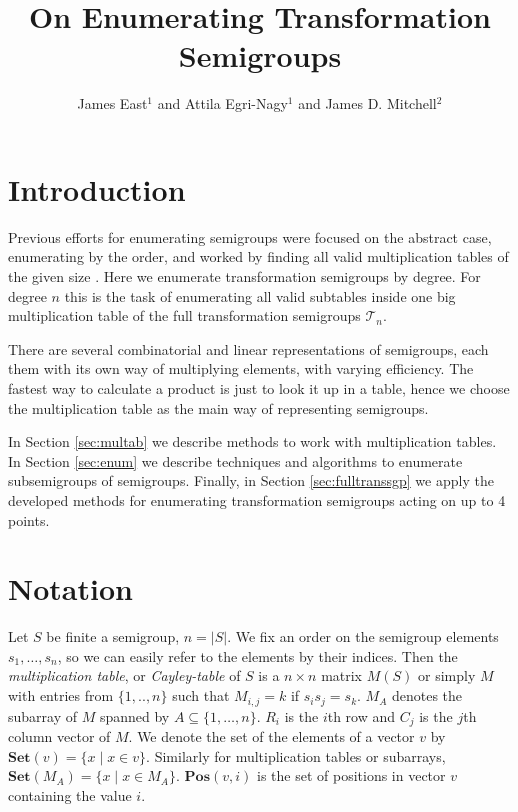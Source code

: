 \documentclass{amsart}
\newcommand{\cT}{{\mathcal T}}
\newcommand{\Set}{\mathbf{Set}}
\newcommand{\Pos}{\mathbf{Pos}}
\theoremstyle{plain}
\theoremstyle{definition}
\begin{document}
\title{On Enumerating Transformation Semigroups}
\author{James East$^1$ and Attila Egri-Nagy$^{1}$ and James D. Mitchell$^2$}
\address{$^1$Centre for Research in Mathematics, School of Computing, Engineering and Mathematics, University of Western Sydney (Parramatta Campus), Locked Bag 1797, Penrith, NSW 2751, Australia}
\address{$^2$ Mathematical Institute, University of St Andrews, North Haugh, St Andrews, Fife, KY16 9SS, Scotland}

\maketitle
\begin{abstract}
\end{abstract}
\tableofcontents
\section{Introduction}
Previous efforts for enumerating semigroups were focused on the abstract case, enumerating by the order, and worked by finding all valid multiplication tables of the given size \cite{For55,tamura1,tamura2,Ple67,KRS76,JW77,SZT94,monoidenum2009}.
Here we enumerate transformation semigroups by degree.
For degree $n$ this is the task of enumerating all valid subtables inside one big multiplication table of the  full transformation semigroups $\cT_n$.

There are several combinatorial and linear representations of semigroups, each them with its own way of multiplying elements, with varying efficiency.
The fastest way to calculate a product is just to look it up in a table, hence we choose the multiplication table as the main way of representing semigroups.

In Section \ref{sec:multab} we describe methods to work with multiplication tables.
In Section \ref{sec:enum} we describe techniques and algorithms to enumerate subsemigroups of semigroups.
Finally, in Section \ref{sec:fulltranssgp} we apply the developed methods for enumerating transformation semigroups acting on up to 4 points.
\section{Notation}
Let $S$ be finite a semigroup, $n=|S|$.
We fix an order on the semigroup elements $s_1,\ldots, s_n$, so we can easily refer to the elements by their indices. 
Then the  \emph{multiplication table}, or \emph{Cayley-table} of $S$ is a $n\times n$ matrix $M(S)$ or simply $M$ with entries from $\{1,..,n\}$ such that $M_{i,j}=k$ if $s_is_j=s_k$.
$M_A$ denotes the subarray of $M$ spanned by $A\subseteq\{1,\ldots,n\}$.
$R_i$ is the $i$th row and $C_j$ is the $j$th column vector of $M$.
We denote the set of the elements of a vector $v$ by $\Set(v)=\{x\mid x\in v\}$.
Similarly for multiplication tables or subarrays, $\Set(M_A)=\{x\mid x\in M_A\}$.
$\Pos(v,i)$ is the set of positions in vector $v$ containing the value $i$.
\end{document}
